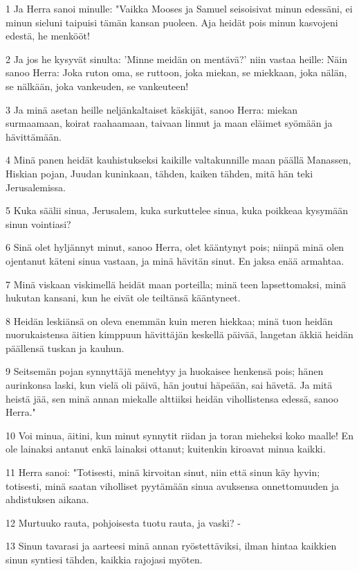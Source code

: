 \par 1 Ja Herra sanoi minulle: "Vaikka Mooses ja Samuel seisoisivat minun edessäni, ei minun sieluni taipuisi tämän kansan puoleen. Aja heidät pois minun kasvojeni edestä, he menkööt!
\par 2 Ja jos he kysyvät sinulta: 'Minne meidän on mentävä?' niin vastaa heille: Näin sanoo Herra: Joka ruton oma, se ruttoon, joka miekan, se miekkaan, joka nälän, se nälkään, joka vankeuden, se vankeuteen!
\par 3 Ja minä asetan heille neljänkaltaiset käskijät, sanoo Herra: miekan surmaamaan, koirat raahaamaan, taivaan linnut ja maan eläimet syömään ja hävittämään.
\par 4 Minä panen heidät kauhistukseksi kaikille valtakunnille maan päällä Manassen, Hiskian pojan, Juudan kuninkaan, tähden, kaiken tähden, mitä hän teki Jerusalemissa.
\par 5 Kuka säälii sinua, Jerusalem, kuka surkuttelee sinua, kuka poikkeaa kysymään sinun vointiasi?
\par 6 Sinä olet hyljännyt minut, sanoo Herra, olet kääntynyt pois; niinpä minä olen ojentanut käteni sinua vastaan, ja minä hävitän sinut. En jaksa enää armahtaa.
\par 7 Minä viskaan viskimellä heidät maan porteilla; minä teen lapsettomaksi, minä hukutan kansani, kun he eivät ole teiltänsä kääntyneet.
\par 8 Heidän leskiänsä on oleva enemmän kuin meren hiekkaa; minä tuon heidän nuorukaistensa äitien kimppuun hävittäjän keskellä päivää, langetan äkkiä heidän päällensä tuskan ja kauhun.
\par 9 Seitsemän pojan synnyttäjä menehtyy ja huokaisee henkensä pois; hänen aurinkonsa laski, kun vielä oli päivä, hän joutui häpeään, sai hävetä. Ja mitä heistä jää, sen minä annan miekalle alttiiksi heidän vihollistensa edessä, sanoo Herra."
\par 10 Voi minua, äitini, kun minut synnytit riidan ja toran mieheksi koko maalle! En ole lainaksi antanut enkä lainaksi ottanut; kuitenkin kiroavat minua kaikki.
\par 11 Herra sanoi: "Totisesti, minä kirvoitan sinut, niin että sinun käy hyvin; totisesti, minä saatan viholliset pyytämään sinua avuksensa onnettomuuden ja ahdistuksen aikana.
\par 12 Murtuuko rauta, pohjoisesta tuotu rauta, ja vaski? -
\par 13 Sinun tavarasi ja aarteesi minä annan ryöstettäviksi, ilman hintaa kaikkien sinun syntiesi tähden, kaikkia rajojasi myöten.
